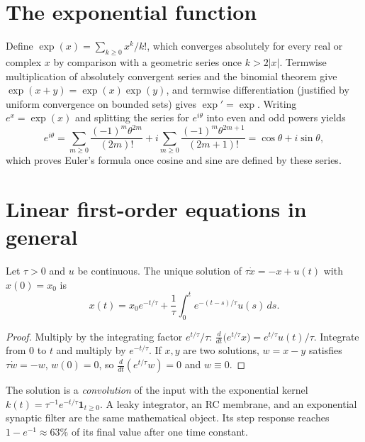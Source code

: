 \section{The exponential function}
Define $\exp(x)=\sum_{k\ge0}x^k/k!$, which converges absolutely for every real or complex $x$ by comparison with a geometric series once $k>2|x|$. Termwise multiplication of absolutely convergent series and the binomial theorem give $\exp(x+y)=\exp(x)\exp(y)$, and termwise differentiation (justified by uniform convergence on bounded sets) gives $\exp'=\exp$. Writing $e^x=\exp(x)$ and splitting the series for $e^{i\theta}$ into even and odd powers yields
\[
e^{i\theta}=\sum_{m\ge0}\frac{(-1)^m\theta^{2m}}{(2m)!}+i\sum_{m\ge0}\frac{(-1)^m\theta^{2m+1}}{(2m+1)!}=\cos\theta+i\sin\theta,
\]
which proves Euler's formula once cosine and sine are defined by these series.

\section{Linear first-order equations in general}
\begin{theorem}
Let $\tau>0$ and $u$ be continuous. The unique solution of $\tau\dot x=-x+u(t)$ with $x(0)=x_0$ is
\[
x(t)=x_0e^{-t/\tau}+\frac1\tau\int_0^te^{-(t-s)/\tau}u(s)\,ds.
\]
\end{theorem}
\begin{proof}
Multiply by the integrating factor $e^{t/\tau}/\tau$: $\frac d{dt}\bigl(e^{t/\tau}x\bigr)=e^{t/\tau}u(t)/\tau$. Integrate from $0$ to $t$ and multiply by $e^{-t/\tau}$. If $x,y$ are two solutions, $w=x-y$ satisfies $\tau\dot w=-w$, $w(0)=0$, so $\frac d{dt}(e^{t/\tau}w)=0$ and $w\equiv0$.
\end{proof}
The solution is a \emph{convolution} of the input with the exponential kernel $k(t)=\tau^{-1}e^{-t/\tau}\mathbf 1_{t\ge0}$. A leaky integrator, an RC membrane, and an exponential synaptic filter are the same mathematical object. Its step response reaches $1-e^{-1}\approx63\%$ of its final value after one time constant.

